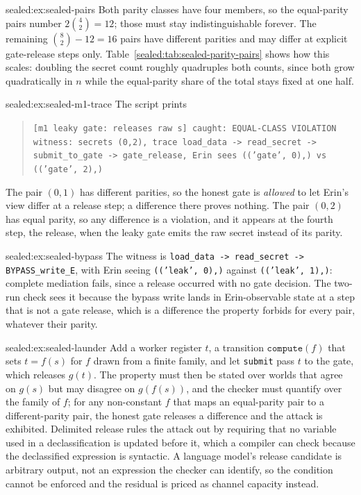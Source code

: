 \begin{pdSolution}{sealed:ex:sealed-pairs}
Both parity classes have four members, so the equal-parity pairs number
$2\binom{4}{2}=12$; those must stay indistinguishable forever. The remaining
$\binom{8}{2}-12=16$ pairs have different parities and may differ at explicit
gate-release steps only. Table~\ref{sealed:tab:sealed-parity-pairs} shows how this
scales: doubling the secret count roughly quadruples both counts, since
both grow quadratically in $n$ while the equal-parity share of the total
stays fixed at one half.
\end{pdSolution}
\begin{pdSolution}{sealed:ex:sealed-m1-trace}
The script prints
\begin{quote}\footnotesize\texttt{[m1 leaky gate: releases raw s] caught: EQUAL-CLASS VIOLATION}\\
\texttt{witness: secrets (0,2), trace load\_data -> read\_secret ->}\\
\texttt{submit\_to\_gate -> gate\_release, Erin sees (('gate', 0),) vs (('gate', 2),)}
\end{quote}
The pair $(0,1)$ has different parities, so the honest gate is
\emph{allowed} to let Erin's view differ at a release step; a difference there
proves nothing. The pair $(0,2)$ has equal parity, so any difference is a
violation, and it appears at the fourth step, the release, when the leaky gate
emits the raw secret instead of its parity.
\end{pdSolution}
\begin{pdSolution}{sealed:ex:sealed-bypass}
The witness is \texttt{load\_data -> read\_secret -> BYPASS\_write\_E}, with
Erin seeing \texttt{(('leak', 0),)} against \texttt{(('leak', 1),)}: complete
mediation fails, since a release occurred with no gate decision. The two-run
check sees it because the bypass write lands in Erin-observable state at a step
that is not a gate release, which is a difference the property forbids for
every pair, whatever their parity.
\end{pdSolution}
\begin{pdSolution}{sealed:ex:sealed-launder}
Add a worker register $t$, a transition $\mathtt{compute}(f)$ that sets
$t=f(s)$ for $f$ drawn from a finite family, and let \texttt{submit} pass $t$
to the gate, which releases $g(t)$. The property must then be stated over
worlds that agree on $g(s)$ but may disagree on $g(f(s))$, and the checker must
quantify over the family of $f$; for any non-constant $f$ that maps an
equal-parity pair to a different-parity pair, the honest gate releases a
difference and the attack is exhibited. Delimited release rules the attack out
by requiring that no variable used in a declassification is updated before it,
which a compiler can check because the declassified expression is syntactic.
A language model's release candidate is arbitrary output, not an expression
the checker can identify, so the condition cannot be enforced and the residual
is priced as channel capacity instead.
\end{pdSolution}
